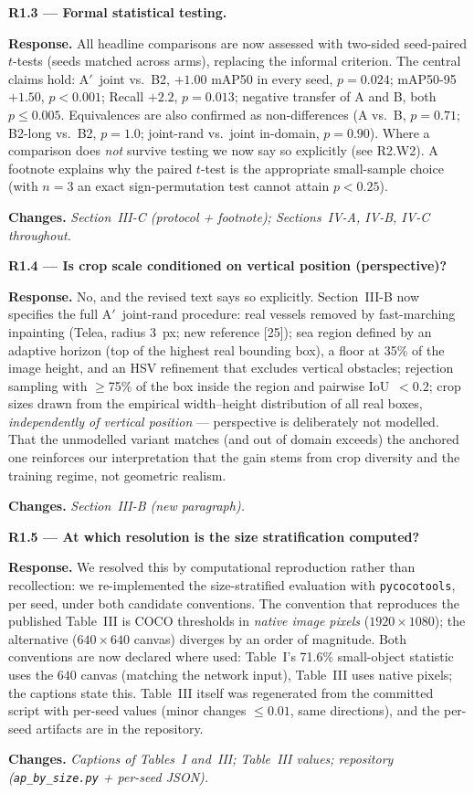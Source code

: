\documentclass[11pt]{article}
\newcommand{\resp}[1]{\par\noindent\textbf{Response.} #1}
\newcommand{\chg}[1]{\par\noindent\textbf{Changes.} \textit{#1}}
\newcommand{\pt}[1]{\par\medskip\noindent\textbf{#1}}
\begin{document}
\pt{R1.3 --- Formal statistical testing.}
\resp{All headline comparisons are now assessed with two-sided seed-paired
$t$-tests (seeds matched across arms), replacing the informal criterion. The
central claims hold: A$'$~joint vs.\ B2, $+1.00$ mAP50 in every seed,
$p=0.024$; mAP50-95 $+1.50$, $p<0.001$; Recall $+2.2$, $p=0.013$; negative
transfer of A and B, both $p\le0.005$. Equivalences are also confirmed as
non-differences (A vs.\ B, $p=0.71$; B2-long vs.\ B2, $p=1.0$; joint-rand vs.\
joint in-domain, $p=0.90$). Where a comparison does \emph{not} survive testing
we now say so explicitly (see R2.W2). A footnote explains why the paired
$t$-test is the appropriate small-sample choice (with $n{=}3$ an exact
sign-permutation test cannot attain $p<0.25$).}
\chg{Section~III-C (protocol + footnote); Sections~IV-A, IV-B, IV-C
throughout.}

\pt{R1.4 --- Is crop scale conditioned on vertical position (perspective)?}
\resp{No, and the revised text says so explicitly. Section~III-B now specifies
the full A$'$~joint-rand procedure: real vessels removed by fast-marching
inpainting (Telea, radius 3~px; new reference [25]); sea region defined by an
adaptive horizon (top of the highest real bounding box), a floor at 35\% of
the image height, and an HSV refinement that excludes vertical obstacles;
rejection sampling with $\ge$75\% of the box inside the region and pairwise
IoU~$<0.2$; crop sizes drawn from the empirical width--height distribution of
all real boxes, \emph{independently of vertical position} --- perspective is
deliberately not modelled. That the unmodelled variant matches (and out of
domain exceeds) the anchored one reinforces our interpretation that the gain
stems from crop diversity and the training regime, not geometric realism.}
\chg{Section~III-B (new paragraph).}

\pt{R1.5 --- At which resolution is the size stratification computed?}
\resp{We resolved this by computational reproduction rather than recollection:
we re-implemented the size-stratified evaluation with \texttt{pycocotools},
per seed, under both candidate conventions. The convention that reproduces the
published Table~III is COCO thresholds in \emph{native image pixels}
($1920\times1080$); the alternative ($640\times640$ canvas) diverges by an
order of magnitude. Both conventions are now declared where used: Table~I's
71.6\% small-object statistic uses the $640$ canvas (matching the network
input), Table~III uses native pixels; the captions state this. Table~III
itself was regenerated from the committed script with per-seed values (minor
changes $\le0.01$, same directions), and the per-seed artifacts are in the
repository.}
\chg{Captions of Tables~I and~III; Table~III values; repository
(\texttt{ap\_by\_size.py} + per-seed JSON).}
\end{document}
